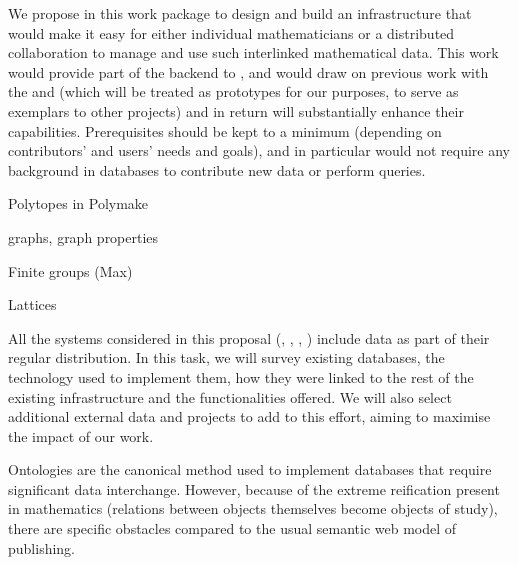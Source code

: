 \begin{workpackage}[id=dksbases,wphases=1-48!.5,
  title=Data/Knowledge/Software-Bases,lead=JU,
  ZHRM=12,JURM=36,UWRM=25,SARM=10,LLRM=2,PSRM=4]
\begin{wpdescription}
  We propose in this work package to design and build an infrastructure that would make it
  easy for either individual mathematicians or a distributed collaboration to manage and
  use such interlinked mathematical data. This work would provide part of the backend to
  , and would draw on previous work
  with the \LMFDB and \FindStat (which will be treated as prototypes for our purposes, to
  serve as exemplars to other projects) and in return will substantially enhance their
  capabilities. Prerequisites should be kept to a minimum (depending on contributors' and
  users' needs and goals), and in particular would not require any background in databases
  to contribute new data or perform queries.
  
      \begin{compactitem}
     \item Polytopes in Polymake
     \item graphs, graph properties
     \item Finite groups (Max)
     \item Lattices
     \end{compactitem}
\end{wpdescription}

\begin{tasklist}
\begin{task}[title=Survey of existing databases,id=data-assessment,
  lead=ZH,partners={JU,SA,UW,US}]
  All the systems considered in this proposal (\GAP, \Sage, \Pari, \Singular) include data
  as part of their regular distribution. In this task, we will survey existing databases,
  the technology used to implement them, how they were linked to the rest of the existing
  infrastructure and the functionalities offered. We will also select additional external
  data and projects to add to this effort, aiming to maximise the impact of our work.
\end{task}

\begin{task}[id=data-design,lead=JU,partners={ZH,US,SA,UW,LL},
  title={Formulation of requirements and design of new  infrastructure when appropriate}]

  Ontologies are the canonical method used to implement databases that require significant
  data interchange. However, because of the extreme reification present in mathematics
  (relations between objects themselves become objects of study), there are specific
  obstacles compared to the usual semantic web model of publishing.


\end{task}
\end{tasklist}
\end{workpackage}
